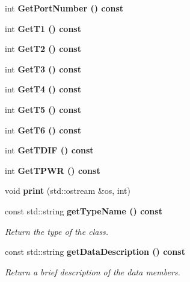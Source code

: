 \begin{CompactItemize}
\item 
int \bf{Get\-Port\-Number} () const \label{classCALICE_1_1TempSensorBlock2_776695a7ae4d40e3221a24adf6b9b03f}

\item 
int \bf{Get\-T1} () const \label{classCALICE_1_1TempSensorBlock2_00301bc28bf3d97d8be10c67617ee4e6}

\item 
int \bf{Get\-T2} () const \label{classCALICE_1_1TempSensorBlock2_0923d251422b4f11431dc1fe38233bfa}

\item 
int \bf{Get\-T3} () const \label{classCALICE_1_1TempSensorBlock2_9659349390410b3d6d72ff96fc497712}

\item 
int \bf{Get\-T4} () const \label{classCALICE_1_1TempSensorBlock2_49950101bd1cb6654947ae9924d52d11}

\item 
int \bf{Get\-T5} () const \label{classCALICE_1_1TempSensorBlock2_3345151695c4d32aeb570ef78d068eae}

\item 
int \bf{Get\-T6} () const \label{classCALICE_1_1TempSensorBlock2_9d9584a309de51438cdd563231afd02a}

\item 
int \bf{Get\-TDIF} () const \label{classCALICE_1_1TempSensorBlock2_4d21b2916b90e4c2317b1c6caf4f9e35}

\item 
int \bf{Get\-TPWR} () const \label{classCALICE_1_1TempSensorBlock2_a9ad3435cd3e360e8b0665bf702d1d9c}

\item 
void \textbf{print} (std::ostream \&os, int)\label{classCALICE_1_1TempSensorBlock2_57a8d8b66742d0dfd5a87f528d853c41}

\item 
const std::string \bf{get\-Type\-Name} () const \label{classCALICE_1_1TempSensorBlock2_49d73b3f58c083affe79d384a95a8eba}

\begin{CompactList}\small\item\em Return the type of the class. \item\end{CompactList}\item 
const std::string \bf{get\-Data\-Description} () const \label{classCALICE_1_1TempSensorBlock2_389b229eec365db12afc8288099e7913}

\begin{CompactList}\small\item\em Return a brief description of the data members. \item\end{CompactList}\end{CompactItemize}


